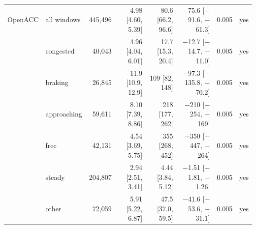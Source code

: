 \begin{longtable}{llrrrrrl}
OpenACC & all windows & 445,496 & 4.98 [4.60, 5.39] & 80.6 [66.2, 96.6] & $-$75.6 [$-$91.6, $-$61.3] & 0.005 & yes \\
 & congested & 40,043 & 4.96 [4.04, 6.01] & 17.7 [15.3, 20.4] & $-$12.7 [$-$14.7, $-$11.0] & 0.005 & yes \\
 & braking & 26,845 & 11.9 [10.9, 12.9] & 109 [82, 148] & $-$97.3 [$-$135.8, $-$70.2] & 0.005 & yes \\
 & approaching & 59,611 & 8.10 [7.39, 8.86] & 218 [177, 262] & $-$210 [$-$254, $-$169] & 0.005 & yes \\
 & free & 42,131 & 4.54 [3.69, 5.75] & 355 [268, 452] & $-$350 [$-$447, $-$264] & 0.005 & yes \\
 & steady & 204,807 & 2.94 [2.51, 3.41] & 4.44 [3.84, 5.12] & $-$1.51 [$-$1.81, $-$1.26] & 0.005 & yes \\
 & other & 72,059 & 5.91 [5.22, 6.87] & 47.5 [37.0, 59.5] & $-$41.6 [$-$53.6, $-$31.1] & 0.005 & yes \\
\end{longtable}
\endgroup
